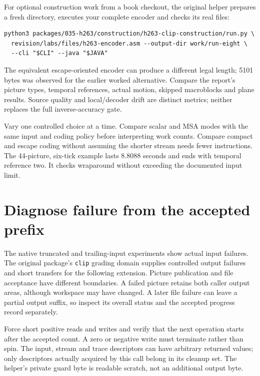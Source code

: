 For optional construction work from a book checkout, the original helper prepares
a fresh directory, executes your complete encoder and checks its real files:
\begin{Verbatim}
python3 packages/035-h263/construction/h263-clip-construction/run.py \
  revision/labs/files/h263-encoder.asm --output-dir work/run-eight \
  --cli "$CLI" --java "$JAVA"
\end{Verbatim}
The equivalent escape-oriented encoder can produce a different legal length;
5101 bytes was observed for the earlier worked alternative. Compare the report's
picture types, temporal references, actual motion, skipped macroblocks and plane
results. Source quality and local/decoder drift are distinct metrics; neither
replaces the full inverse-accuracy gate.

Vary one controlled choice at a time. Compare scalar and MSA modes with the same
input and coding policy before interpreting work counts. Compare compact and
escape coding without assuming the shorter stream needs fewer instructions.
The 44-picture, six-tick example lasts 8.8088 seconds and ends with temporal
reference two. It checks wraparound without exceeding the documented input limit.

\section{Diagnose failure from the accepted prefix}

The native truncated and trailing-input experiments show actual input failures.
The original package's \texttt{clip} grading domain supplies controlled output
failures and short transfers for the following extension. Picture publication
and file acceptance have different boundaries. A failed
picture retains both caller output areas, although workspace may have changed.
A later file failure can leave a partial output suffix, so inspect its overall
status and the accepted progress record separately.

Force short positive reads and writes and verify that the next operation starts
after the accepted count. A zero or negative write must terminate rather than
spin. The input, stream and trace descriptors can have arbitrary returned values;
only descriptors actually acquired by this call belong in its cleanup set.
The helper's private guard byte is readable scratch, not an additional output byte.

